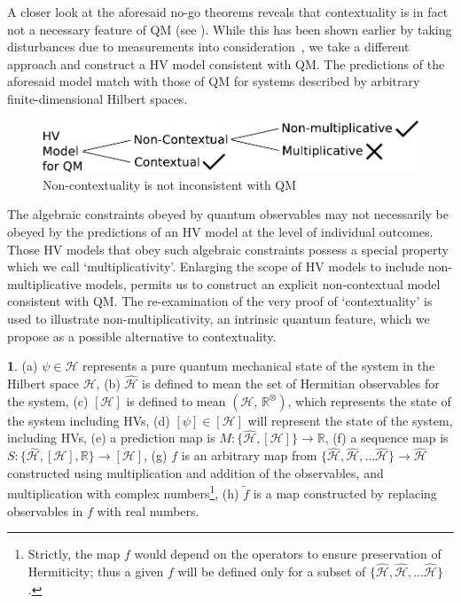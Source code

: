 \documentclass[british,aps,prl,superscriptaddress,nofootinbib,times,reprint]{revtex4-1}
\theoremstyle{plain}
\theoremstyle{plain}
\theoremstyle{definition}
\theoremstyle{remark}
\theoremstyle{remark}
\theoremstyle{remark}
\theoremstyle{plain}
\theoremstyle{plain}
\theoremstyle{plain}
\theoremstyle{definition}
\theoremstyle{definition}
\newtheorem*{notn*}{\protect\notationname}
\providecommand{\notationname}{Notation}
\begin{document}
A closer look at the aforesaid no-go theorems
reveals that contextuality is in fact not a
necessary feature of QM (see ).
While this has been shown earlier by taking
disturbances due to measurements into
consideration~\cite{NoContextuality,LaCourNoCntx},
we take a different approach and construct a
HV model consistent with QM.  The predictions of
the aforesaid model match with those of QM for systems
described by arbitrary finite-dimensional Hilbert
spaces.  \begin{figure}[h]
\includegraphics[width=0.9\columnwidth]{block1}
\caption{Non-contextuality is not inconsistent
with QM} \label{fig:block}\end{figure} The
algebraic constraints obeyed by quantum
observables may not necessarily be obeyed by the
predictions of an HV model at the level of
individual outcomes.  Those HV models that obey
such algebraic constraints possess a special
property which we call `multiplicativity'.  
Enlarging the scope of HV models to include
non-multiplicative models, permits us to construct an
explicit non-contextual model consistent with QM.
The re-examination of the very proof of
`contextuality'  is used to illustrate
non-multiplicativity, an intrinsic quantum feature, 
which we propose as a possible alternative to contextuality. 


\begin{notn*}
(a) $\psi\in\mathcal{H}$ 
represents a pure quantum mechanical
state of the system in the Hilbert space
$\mathcal{H}$, (b) $\hat{\mathcal{H}}$ is defined
to mean the set of Hermitian 
observables for the system, (c)
$[\mathcal{H}]$ is defined to mean
$(\mathcal{H},\,\mathbb{R}^{\otimes})$, which
represents the state of the system including HVs,
(d) $[\psi]\in[\mathcal{H}]$ will represent the
state of the system, including HVs, (e) a
prediction map is
$M:\{ \hat{\mathcal{H}},[\mathcal{H}] \}\to\mathbb{R}$,
(f) a sequence map is
$S:\{ \hat{\mathcal{H}},[\mathcal{H}],\mathbb{R} \}\to[\mathcal{H}]$,
(g) $f$ is an arbitrary map from $\{
\hat{\mathcal{H}},\hat{\mathcal{H}},\dots\hat{\mathcal{H}}
\} \to \hat{\mathcal{H}}$ constructed using
multiplication and addition of the observables,
and multiplication with complex
numbers\footnote{Strictly, the map $f$ would
depend on the operators to ensure preservation of
Hermiticity; thus a given $f$ will be defined only
for a subset of $\{
\hat{\mathcal{H}},\hat{\mathcal{H}},\dots\hat{\mathcal{H}}
\}$.}, (h) $\tilde{f}$ is a map constructed by
replacing observables in $f$ with real numbers.
\end{notn*}
\end{document}

